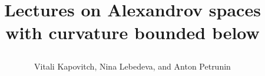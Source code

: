 \documentclass[twoside]{book}
\def\thetitle{Lectures on Alexandrov spaces with curvature bounded below}
\begin{document}
\frontmatter
\title{\parbox{8cm}{\centering\thetitle}}
\author{Vitali Kapovitch, Nina Lebedeva, and Anton Petrunin}
\date{}
\maketitle
\thispagestyle{empty}

\mainmatter
\newpage
\cleardoublepage
{}
{}
\tableofcontents
















\backmatter



{
\cleardoublepage
{}
\sloppy
{}

}

{
\def\emph{\textit}
\sloppy
\printbibliography[heading=bibintoc]
\fussy
}
\end{document}

